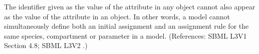 The identifier given as the value of the attribute  in
any \InitialAssignment object cannot also appear as the value of the
 attribute in an \AssignmentRule object.  In other words, a
model cannot simultaneously define both an initial assignment and an
assignment rule for the same species, compartment or parameter in a model.
(References: SBML L3V1 Section 4.8; SBML L3V2 .)
